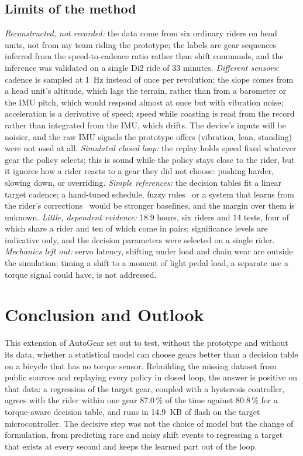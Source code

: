 \documentclass[conference]{IEEEtran}
\newcommand{\pct}{\,\%}
\begin{document}
\subsection{Limits of the method}
\emph{Reconstructed, not recorded:} the data come from six ordinary riders on head units, not from my team riding the prototype; the labels are gear sequences inferred from the speed-to-cadence ratio rather than shift commands, and the inference was validated on a single Di2 ride of 33 minutes.
\emph{Different sensors:} cadence is sampled at 1~Hz instead of once per revolution; the slope comes from a head unit's altitude, which lags the terrain, rather than from a barometer or the IMU pitch, which would respond almost at once but with vibration noise; acceleration is a derivative of speed; speed while coasting is read from the record rather than integrated from the IMU, which drifts. The device's inputs will be noisier, and the raw IMU signals the prototype offers (vibration, lean, standing) were not used at all.
\emph{Simulated closed loop:} the replay holds speed fixed whatever gear the policy selects; this is sound while the policy stays close to the rider, but it ignores how a rider reacts to a gear they did not choose: pushing harder, slowing down, or overriding.
\emph{Simple references:} the decision tables fit a linear target cadence; a hand-tuned schedule, fuzzy rules~\cite{fuzzy} or a system that learns from the rider's corrections~\cite{qauto} would be stronger baselines, and the margin over them is unknown.
\emph{Little, dependent evidence:} 18.9 hours, six riders and 14 tests, four of which share a rider and ten of which come in pairs; significance levels are indicative only, and the decision parameters were selected on a single rider.
\emph{Mechanics left out:} servo latency, shifting under load and chain wear are outside the simulation; timing a shift to a moment of light pedal load, a separate use a torque signal could have, is not addressed.

\section{Conclusion and Outlook}
This extension of AutoGear set out to test, without the prototype and without its data, whether a statistical model can choose gears better than a decision table on a bicycle that has no torque sensor. Rebuilding the missing dataset from public sources and replaying every policy in closed loop, the answer is positive on that data: a regression of the target gear, coupled with a hysteresis controller, agrees with the rider within one gear 87.0\pct{} of the time against 80.8\pct{} for a torque-aware decision table, and runs in 14.9~KB of flash on the target microcontroller. The decisive step was not the choice of model but the change of formulation, from predicting rare and noisy shift events to regressing a target that exists at every second and keeps the learned part out of the loop.
\end{document}
